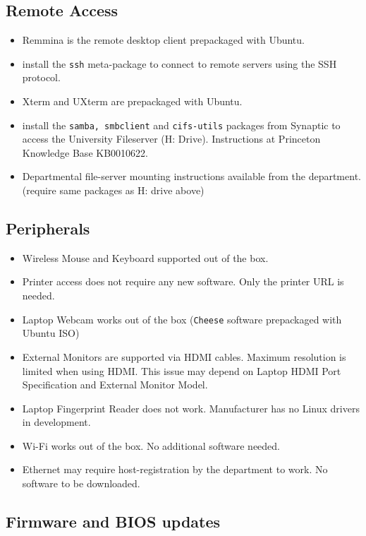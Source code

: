 \documentclass[8pt,a4paper]{article}
\begin{document}
\subsection{Remote Access}

\begin{itemize}
	\item Remmina is the remote desktop client prepackaged with Ubuntu.
	\item install the \texttt{ssh} meta-package to connect to remote servers using the SSH protocol.
	\item Xterm and UXterm are prepackaged with Ubuntu.
	\item install the \texttt{samba, smbclient} and \texttt{cifs-utils} packages from Synaptic to access the University Fileserver (H: Drive). Instructions at Princeton Knowledge Base KB0010622.
	\item Departmental file-server mounting instructions available from the department. (require same packages as H: drive above)

\end{itemize}

\subsection{Peripherals}

\begin{itemize}
	\item Wireless Mouse and Keyboard supported out of the box.
	\item Printer access does not require any new software. Only the printer URL is needed.
	\item Laptop Webcam works out of the box (\texttt{Cheese} software prepackaged with Ubuntu ISO)
	\item External Monitors are supported via HDMI cables. Maximum resolution is limited when using HDMI. This issue may depend on Laptop HDMI Port Specification and External Monitor Model.
	\item Laptop Fingerprint Reader does not work. Manufacturer has no Linux drivers in development.
	\item Wi-Fi works out of the box. No additional software needed.
	\item Ethernet may require host-registration by the department to work. No software to be downloaded.
\end{itemize}

\subsection{Firmware and BIOS updates}
\end{document}
